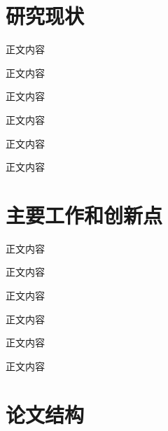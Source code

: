 \section{研究现状}
正文内容

正文内容



正文内容

正文内容

正文内容

正文内容

\section{主要工作和创新点}
正文内容

正文内容

正文内容

正文内容

正文内容

正文内容

\section{论文结构}

